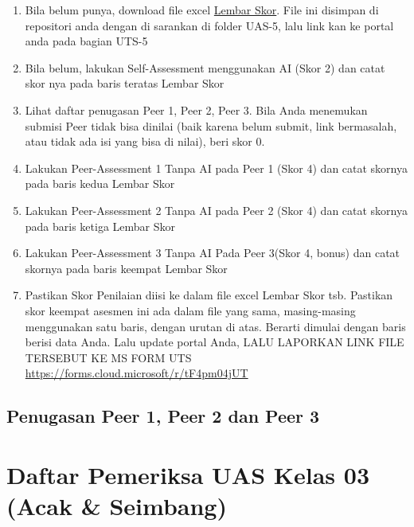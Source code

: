 \documentclass[
  letterpaper,
  DIV=11,
  numbers=noendperiod]{scrreprt}
\providecommand{\tightlist}{%
  \setlength{\itemsep}{0pt}\setlength{\parskip}{0pt}}
\begin{document}
\begin{enumerate}
\def\labelenumi{\arabic{enumi}.}
\tightlist
\item
  Bila belum punya, download file excel \href{./UAS-5_Skor.xlsx}{Lembar
  Skor}. File ini disimpan di repositori anda dengan di sarankan di
  folder UAS-5, lalu link kan ke portal anda pada bagian UTS-5
\item
  Bila belum, lakukan Self-Assessment menggunakan AI (Skor 2) dan catat
  skor nya pada baris teratas Lembar Skor
\item
  Lihat daftar penugasan Peer 1, Peer 2, Peer 3. Bila Anda menemukan
  submisi Peer tidak bisa dinilai (baik karena belum submit, link
  bermasalah, atau tidak ada isi yang bisa di nilai), beri skor 0.
\item
  Lakukan Peer-Assessment 1 Tanpa AI pada Peer 1 (Skor 4) dan catat
  skornya pada baris kedua Lembar Skor
\item
  Lakukan Peer-Assessment 2 Tanpa AI pada Peer 2 (Skor 4) dan catat
  skornya pada baris ketiga Lembar Skor
\item
  Lakukan Peer-Assessment 3 Tanpa AI Pada Peer 3(Skor 4, bonus) dan
  catat skornya pada baris keempat Lembar Skor
\item
  Pastikan Skor Penilaian diisi ke dalam file excel Lembar Skor tsb.
  Pastikan skor keempat asesmen ini ada dalam file yang sama,
  masing-masing menggunakan satu baris, dengan urutan di atas. Berarti
  dimulai dengan baris berisi data Anda. Lalu update portal Anda, LALU
  LAPORKAN LINK FILE TERSEBUT KE MS FORM UTS
  \url{https://forms.cloud.microsoft/r/tF4pm04jUT}
\end{enumerate}

\section*{Penugasan Peer 1, Peer 2 dan Peer
3}\label{penugasan-peer-1-peer-2-dan-peer-3-2}



\chapter*{Daftar Pemeriksa UAS Kelas 03 (Acak \&
Seimbang)}\label{daftar-pemeriksa-uas-kelas-03-acak-seimbang}
\end{document}

